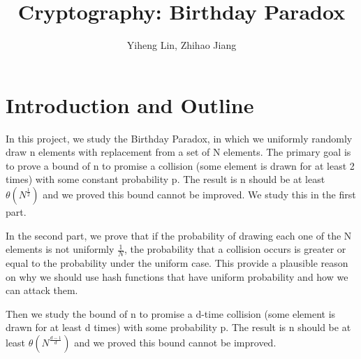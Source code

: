 \documentclass{article}
\title{\textmd{\bf Cryptography: Birthday Paradox}}
\date{}
\author{Yiheng Lin, Zhihao Jiang}
\begin{document}
    \begin{spacing}{1.1}
    \maketitle %

    
    \section{Introduction and Outline}
    In this project, we study the Birthday Paradox, in which we uniformly randomly draw n elements with replacement from a set of N elements. The primary goal is to prove a bound of n to promise a collision (some element is drawn for at least 2 times) with some constant probability p. The result is n should be at least $\theta(N^{\frac{1}{2}})$ and we proved this bound cannot be improved. We study this in the first part.

    In the second part, we prove that if the probability of drawing each one of the N elements is not uniformly $\frac{1}{N}$, the probability that a collision occurs is greater or equal to the probability under the uniform case. This provide a plausible reason on why we should use hash functions that have uniform probability and how we can attack them.
    
    Then we study the bound of n to promise a d-time collision (some element is drawn for at least d times) with some probability p. The result is n should be at least $\theta(N^{\frac{d-1}{d}})$ and we proved this bound cannot be improved.
    \section{}

\end{spacing}
\end{document}
